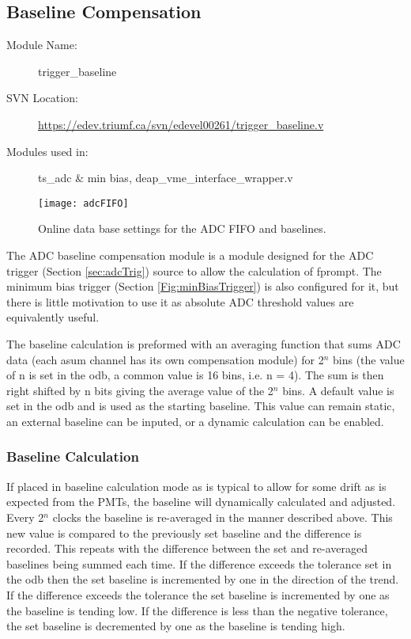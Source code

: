 	
	\subsection{Baseline Compensation}
	\label{sec:baseline}
	\begin{description}
	\item[Module Name:] trigger\_baseline
	\item[SVN Location:] \url{https://edev.triumf.ca/svn/edevel00261/trigger\_baseline.v}
	\item[Modules used in:] ts\_adc $\&$ min bias, deap\_vme\_interface\_wrapper.v 
	\end{description}
	
	
	\begin{figure}[ht]
	\centering
	\texttt{[image: adcFIFO]}
	\caption{Online data base settings for the ADC FIFO and baselines.}
	\label{Fig:adcFIFO}
	\end{figure}
	
	
	The ADC baseline compensation module is a module designed for the ADC trigger (Section \ref{sec:adcTrig}) source to allow the calculation of \gls{fprompt}. The minimum bias trigger (Section \ref{Fig:minBiasTrigger}) is also configured for it, but there is little motivation to use it as absolute ADC threshold values are equivalently useful.
	
	The baseline calculation is preformed with an averaging function that sums ADC data (each \gls{asum} channel has its own compensation module) for 2$^n$ bins (the value of n is set in the \gls{odb}, a common value is 16 bins, i.e. n = 4). The sum is then right shifted by n bits giving the average value of the 2$^n$ bins.
	A default value is set in the \gls{odb} and is used as the starting baseline. This value can remain static, an external baseline can be inputed, or a dynamic calculation can be enabled.
	
		\subsubsection{Baseline Calculation}
		
		If placed in baseline calculation mode as is typical to allow for some drift as is expected from the PMTs, the baseline will dynamically calculated and adjusted. Every 2$^n$ clocks the baseline is re-averaged in the manner described above. This new value is compared to the previously set baseline and the difference is recorded. This repeats with the difference between the set and re-averaged baselines being summed each time. If the difference exceeds the tolerance set in the \gls{odb} then the set baseline is incremented by one in the direction of the trend. If the difference exceeds the tolerance the set baseline is incremented by one as the baseline is tending low. If the difference is less than the negative tolerance, the set baseline is decremented by one as the baseline is tending high.
		
